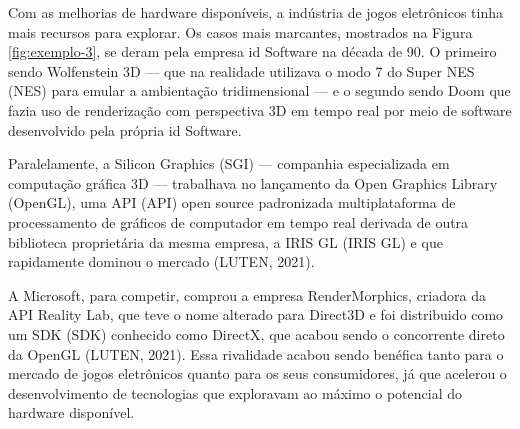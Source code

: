 Com as melhorias de hardware disponíveis, a indústria de jogos eletrônicos tinha mais recursos para explorar. Os casos mais marcantes, mostrados na Figura \ref{fig:exemplo-3}, se deram pela empresa id Software na década de 90. O primeiro sendo Wolfenstein 3D --- que na realidade utilizava o modo 7 do Super NES (\acrlong{NES}) para emular a ambientação tridimensional --- e o segundo sendo Doom que fazia uso de renderização com perspectiva 3D em tempo real por meio de software desenvolvido pela própria id Software.
	
    \begin{figure}[h]
		\centering
	\end{figure}
	\nocite{figura3}
	
Paralelamente, a Silicon Graphics (\acrshort{SGI}) --- companhia especializada em computação gráfica 3D --- trabalhava no lançamento da Open Graphics Library (\acrshort{OpenGL}), uma API (\acrlong{API}) open source padronizada multiplataforma de processamento de gráficos de computador em tempo real derivada de outra biblioteca proprietária da mesma empresa, a IRIS GL (\acrlong{IRIS GL}) e que rapidamente dominou o mercado (LUTEN, 2021)\nocite{openGLBook}. 

A Microsoft, para competir, comprou a empresa RenderMorphics, criadora da \acrshort{API} Reality Lab, que teve o nome alterado para Direct3D e foi distribuido como um SDK (\acrlong{SDK}) conhecido como DirectX, que acabou sendo o concorrente direto da \acrshort{OpenGL} (LUTEN, 2021)\nocite{openGLBook}. Essa rivalidade acabou sendo benéfica tanto para o mercado de jogos eletrônicos quanto para os seus consumidores, já que acelerou o desenvolvimento de tecnologias que exploravam ao máximo o potencial do hardware disponível.
	
